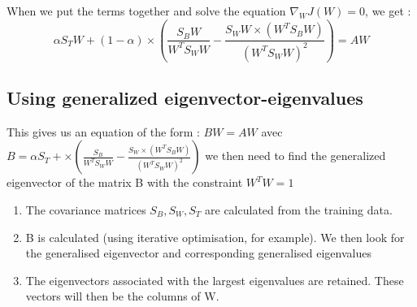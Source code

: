 When we put the terms together and solve the equation $\nabla_WJ(W) = 0$, we get : 
$$\alpha S_T W + (1 - \alpha) \times (\frac{S_BW}{W^TS_WW} - \frac{S_WW \times (W^TS_BW)}{(W^TS_WW)^2}) = AW$$

\subsection{Using generalized eigenvector-eigenvalues}

This gives us an equation of the form : $BW = AW$ avec $B = \alpha S_T + \times (\frac{S_B}{W^TS_WW} - \frac{S_W \times (W^TS_BW)}{(W^TS_WW)^2})$ we then need to find the generalized eigenvector of the matrix B with the constraint $W^TW = 1$

\begin{enumerate}
	\item The covariance matrices $S_B, S_W, S_T$ are calculated from the training data.
	\item B is calculated (using iterative optimisation, for example). We then look for the generalised eigenvector and corresponding generalised eigenvalues
	\item The eigenvectors associated with the largest eigenvalues are retained. These vectors will then be the columns of W.
\end{enumerate}
